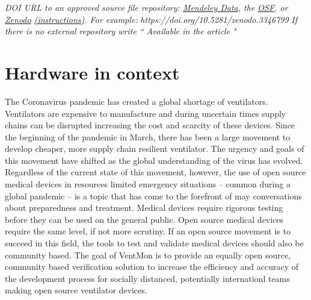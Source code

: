 \documentclass[11pt, letterpaper]{article}
\begin{document}
\begin{flushleft}
\begin{tabu}
  \textit{DOI URL to an approved source file repository:  \href{https://data.mendeley.com/}{Mendeley Data}, the \href{http://osf.io}{OSF}, or \href{https://zenodo.org/}{Zenodo} \href{https://doi.org/10.5281/zenodo.3346799}{(instructions)}. For example:} \textit{https://doi.org/10.5281/zenodo.3346799} \linebreak \linebreak
  \textit{If there is no external repository write “} \textit{Available in the article} \textit{"}
\\\hline
\end{tabu}
\end{flushleft}

\section{Hardware in context}
The Coronavirus pandemic has created a global shortage of ventilators.
Ventilators are expensive to manufacture and during uncertain times supply chains can be disrupted
increasing the cost and scarcity of these devices.
Since the beginning of the pandemic in March, there has been a large movement to develop cheaper,
more supply chain resilient ventilator.
The urgency and goals of this movement have shifted as the global understanding of the virus has evolved.
Regardless of the current state of this movement, however, the use of open source medical devices in resources
limited emergency situations -- common during a global pandemic --
is a topic that has come to the forefront of may conversations about preparedness and treatment.
Medical devices require rigorous testing before they can be used on the general public.
Open source medical devices require the same level, if not more scrutiny.
If an open source movement is to succeed in this field, the tools to test and validate
medical devices should also be community based.
The goal of VentMon is to provide an equally open source, community based verification solution
to increase the efficiency and accuracy of the development process for socially distanced, potentially internationl
teams making open source ventilator devices.
\end{document}
